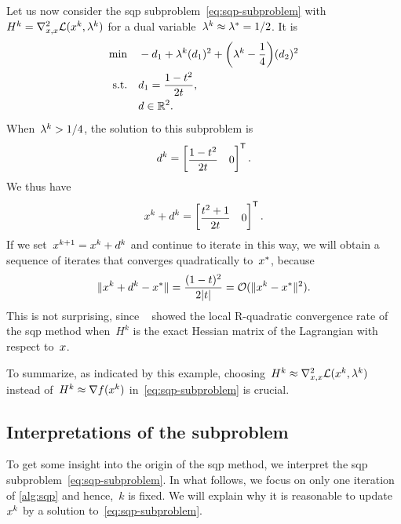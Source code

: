 Let us now consider the \gls{sqp} subproblem~\cref{eq:sqp-subproblem} with~$H^k = \nabla_{x, x}^2 \lag(\iter[k], \lm[k])$ for a dual variable~$\lm[k] \approx \lm[\ast] = 1/2$.
It is
\begin{align*}
    \min        & \quad -\step_1 + \lm[k] (\step_1)^2 + \bigg( \lm[k] - \frac{1}{4} \bigg) (\step_2)^2\\
    \text{s.t.} & \quad \step_1 = \frac{1 - t^2}{2 t},\\
                & \quad \step \in \R^2. \nonumber
\end{align*}
When~$\lm[k] > 1/4$, the solution to this subproblem is
\begin{equation*}
    \step[k] =
    \begin{bmatrix}
        \dfrac{1 - t^2}{2 t}    & 0
    \end{bmatrix}^{\T}.
\end{equation*}
We thus have
\begin{equation*}
    \iter[k] + \step[k] =
    \begin{bmatrix}
        \dfrac{t^2 + 1}{2 t}  & 0
    \end{bmatrix}^{\T}.
\end{equation*}
If we set~$\iter[k + 1] = \iter[k] + \step[k]$ and continue to iterate in this way, we will obtain a sequence of iterates that converges quadratically to~$\iter[\ast]$, because
\begin{equation*}
    \norm{\iter[k] + \step[k] - \iter[\ast]} = \frac{(1 - t)^2}{2 \abs{t}} = \bigo(\norm{\iter[k] - \iter[\ast]}^2).
\end{equation*}
This is not surprising, since \citeauthor{Robinson_1974}~\cite{Robinson_1974} showed the local R-quadratic convergence rate of the \gls{sqp} method when~$H^k$ is the exact Hessian matrix of the Lagrangian with respect to~$\iter$.

To summarize, as indicated by this example, choosing~$H^k \approx \nabla_{x, x}^2 \lag(\iter[k], \lm[k])$ instead of~$H^k \approx \nabla \obj(\iter[k])$ in~\cref{eq:sqp-subproblem} is crucial.

\subsection{Interpretations of the  subproblem}
\label{subsec:sqp-interpretation}

To get some insight into the origin of the \gls{sqp} method, we interpret the \gls{sqp} subproblem~\cref{eq:sqp-subproblem}.
In what follows, we focus on only one iteration of \cref{alg:sqp} and hence,~$k$ is fixed.
We will explain why it is reasonable to update~$\iter[k]$ by a solution to~\cref{eq:sqp-subproblem}.


